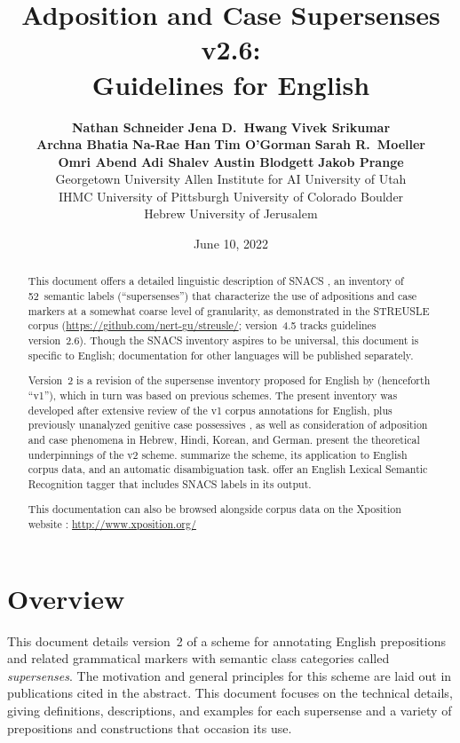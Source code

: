 \documentclass[11pt,letterpaper]{article}
\title{Adposition and Case Supersenses v2.6:\\ Guidelines for English}
\author{\textbf{Nathan Schneider}\affil{G} \quad \textbf{Jena D.~Hwang}\affil{A} \quad \textbf{Vivek Srikumar}\affil{U,A} \\
\textbf{Archna Bhatia}\affil{I} \quad \textbf{Na-Rae Han}\affil{P} \quad \textbf{Tim O'Gorman}\affil{C} \quad \textbf{Sarah R.~Moeller}\affil{C} \\
\textbf{Omri Abend}\affil{H} \quad \textbf{Adi Shalev}\affil{H} \quad \textbf{Austin Blodgett}\affil{G} \quad \textbf{Jakob Prange}\affil{G} \\
  \affil{G} Georgetown University \quad 
  \affil{A} Allen Institute for AI \quad
  \affil{U} University of Utah \\
  \affil{I} IHMC \quad
  \affil{P} University of Pittsburgh \quad
  \affil{C} University of Colorado Boulder \\
  \affil{H} Hebrew University of Jerusalem \\
\eml{nathan.schneider@georgetown.edu} \quad \eml{jenah@allenai.org} \quad \eml{svivek@cs.utah.edu}
}
\date{June 10, 2022}
\makeatletter
\newcommand{\ensuretext}[1]{#1}
\newcommand{\nssmarker}{\ensuretext{\textcolor{magenta}{\ensuremath{^{\textsc{NS}}_{\textsc{S}}}}}}
\newcommand{\arkcomment}[3]{\ensuretext{\textcolor{#3}{[#1 #2]}\index{#1@\textcolor{#3}{#1}}}}
\newcommand{\nss}[1]{\arkcomment{\nssmarker}{#1}{magenta}}
\makeatother
\begin{document}
\maketitle
\begin{abstract}
\noindent 
This document offers a detailed linguistic description of SNACS \citep[Semantic Network of Adposition and Case Supersenses;][]{schneider-18}, 
an inventory of 52~semantic labels (``supersenses'')
that characterize the use of adpositions and case markers 
at a somewhat coarse level of granularity, 
as demonstrated in the STREUSLE corpus (\url{https://github.com/nert-gu/streusle/}; version~4.5 tracks guidelines version~2.6).
Though the SNACS inventory aspires to be universal, this document is specific to English; 
documentation for other languages will be published separately.

Version~2 is a revision of the supersense inventory proposed for English by 
\citet{schneider-15,schneider-16} %
(henceforth ``v1''), which in turn was based on previous schemes.
The present inventory was developed after extensive review of the 
v1 corpus annotations for English, 
plus previously unanalyzed genitive case possessives \citep{blodgett-18},
as well as consideration of adposition 
and case phenomena in Hebrew, Hindi, Korean, and German. 
 present the theoretical underpinnings of the v2 scheme.
 summarize the scheme, its application to English corpus data, 
and an automatic disambiguation task. 
 offer an English Lexical Semantic Recognition tagger that includes SNACS labels in its output. %

This documentation can also be browsed alongside corpus data on the Xposition website \citep{xposition}: \url{http://www.xposition.org/}

\vfill
\end{abstract}


\tableofcontents


\section{Overview}


This document details version~2 of a scheme for annotating English 
prepositions and related grammatical markers with semantic class categories 
called \emph{supersenses}. 
The motivation and general principles for this scheme are laid out in 
publications cited in the abstract. 
This document focuses on the technical details, giving definitions, 
descriptions, and examples for each supersense and a variety of 
prepositions and constructions that occasion its use.
\end{document}
